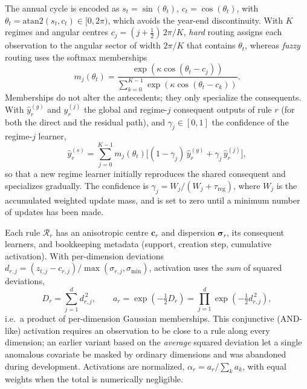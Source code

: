 \documentclass[preprint,12pt]{elsarticle}
\begin{document}
The annual cycle is encoded as $s_t=\sin(\theta_t)$, $c_t=\cos(\theta_t)$, with $\theta_t = \mathrm{atan2}(s_t,c_t) \in [0,2\pi)$, which avoids the year-end discontinuity. With $K$ regimes and angular centres $c_j = (j+\tfrac{1}{2})\,2\pi/K$, \emph{hard} routing assigns each observation to the angular sector of width $2\pi/K$ that contains $\theta_t$, whereas \emph{fuzzy} routing uses the softmax memberships
\begin{equation}
m_j(\theta_t) = \frac{\exp(\kappa\cos(\theta_t - c_j))}{\sum_{k=0}^{K-1}\exp(\kappa\cos(\theta_t - c_k))}.
\label{eq:seasonal_softmax}
\end{equation}
Memberships do not alter the antecedents; they only specialize the consequents. With $\widehat{y}^{(g)}_r$ and $\widehat{y}^{(j)}_r$ the global and regime-$j$ consequent outputs of rule $r$ (for both the direct and the residual path), and $\gamma_j\in[0,1]$ the confidence of the regime-$j$ learner,
\begin{equation}
\widehat{y}^{(s)}_r = \sum_{j=0}^{K-1} m_j(\theta_t)\big[(1-\gamma_j)\,\widehat{y}^{(g)}_r + \gamma_j\,\widehat{y}^{(j)}_r\big],
\label{eq:seasonal_specialization}
\end{equation}
so that a new regime learner initially reproduces the shared consequent and specializes gradually. The confidence is $\gamma_j = W_j/(W_j+\tau_{\mathrm{reg}})$, where $W_j$ is the accumulated weighted update mass, and is set to zero until a minimum number of updates has been made.

\label{subsec:structural_evolution}
Each rule $\mathcal{R}_r$ has an anisotropic centre $\mathbf{c}_r$ and dispersion $\boldsymbol{\sigma}_r$, its consequent learners, and bookkeeping metadata (support, creation step, cumulative activation). With per-dimension deviations $d_{r,j} = (z_{t,j}-c_{r,j})/\max(\sigma_{r,j},\sigma_{\min})$, activation uses the \emph{sum} of squared deviations,
\begin{equation}
D_r = \sum_{j=1}^{d} d_{r,j}^{\,2}, \qquad a_r = \exp\!\left(-\tfrac{1}{2}D_r\right) = \prod_{j=1}^{d}\exp\!\left(-\tfrac{1}{2}d_{r,j}^{\,2}\right),
\label{eq:rule_activation}
\end{equation}
i.e.\ a product of per-dimension Gaussian memberships. This conjunctive (AND-like) activation requires an observation to be close to a rule along every dimension; an earlier variant based on the \emph{average} squared deviation let a single anomalous covariate be masked by ordinary dimensions and was abandoned during development. Activations are normalized, $\alpha_r = a_r/\sum_k a_k$, with equal weights when the total is numerically negligible.
\end{document}
